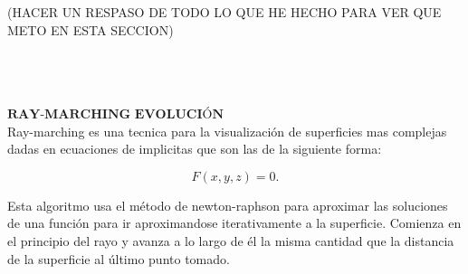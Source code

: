 (HACER UN RESPASO DE TODO LO QUE HE HECHO PARA VER QUE METO EN ESTA SECCION)


${ }$\\
${ }$\\
${ }$\\
$\textbf{RAY-MARCHING EVOLUCIÓN}$
${ }$\\

Ray-marching es una tecnica para la visualización de superficies mas complejas dadas en ecuaciones de implicitas que son las de la siguiente forma:

\[
F(x,y,z) = 0.
\]

Esta algoritmo usa el método de newton-raphson para aproximar las soluciones de una función para ir aproximandose iterativamente a la superficie. Comienza en el principio del rayo y avanza a lo largo de él la misma cantidad que la distancia de la superficie al último punto tomado.